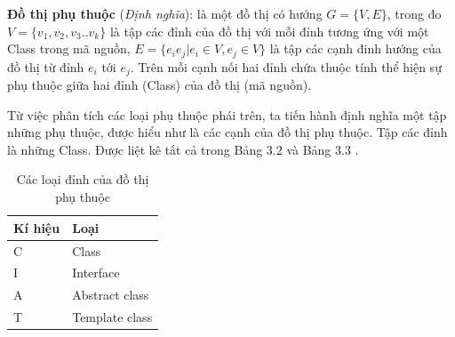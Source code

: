\documentclass[12pt]{report}
\begin{document}
\noindent \textbf{Đồ thị phụ thuộc} (\textit{Định nghĩa}): là một đồ thị có hướng $G = \{V,E \}$, trong đo $V = \{v_1,v_2,v_3..v_k\}$ là tập các đỉnh của đồ thị với mỗi đỉnh tương ứng với một Class trong mã nguồn, $E = \{ e_ie_j | e_i \in V, e_j \in V  \}$ là tập các cạnh đinh hướng của đồ thị từ đỉnh $e_i$ tới $e_j$. Trên mỗi cạnh nối hai đỉnh chứa thuộc tính thể hiện sự phụ thuộc giữa hai đỉnh (Class) của đồ thị (mã nguồn).

\noindent Từ việc phân tích các loại phụ thuộc phái trên, ta tiến hành định nghĩa một tập những phụ thuộc, được hiểu như là các cạnh của đồ thị phụ thuộc. Tập các đỉnh là những Class. Được liệt kê tất cả trong Bảng 3.2 và Bảng 3.3 \cite{orucc2016}.
\begin{table}[!htbp]
	\vspace{-0.5cm}
	\centering
	\caption{Các loại đỉnh của đồ thị phụ thuộc}
	\vspace{0.2cm}
	\label{tbl:java-class-type}
	\renewcommand{\arraystretch}{0.8}
	\begin{tabular}{|p{2.7cm}|p{8.7cm}|}
		\hline
		\textbf{Kí hiệu} & \textbf{Loại} \\ \hline
		C				& Class\\ \hline
		I				& Interface \\ \hline
		A				& Abstract class \\ \hline
		T				& Template class \\ \hline         
	\end{tabular}
\end{table}
\end{document}
